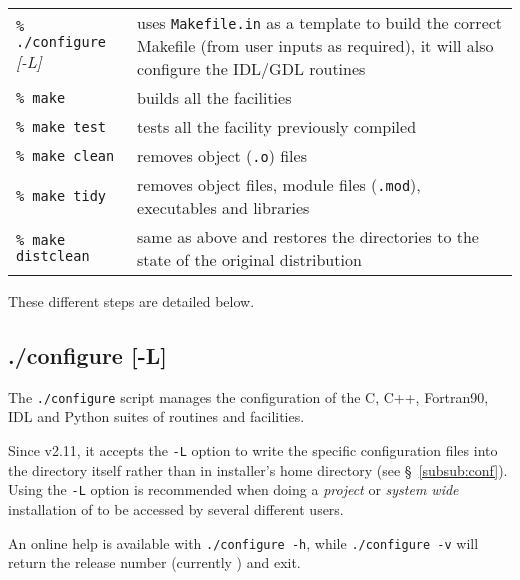 \documentclass[12pt,twoside]{article}
\begin{document}
\begin{flushright}
\begin{tabular}{p{0.3\hsize} p{0.60\hsize}}
{\tt \% ./configure} {\em [-L]}    & uses {\tt Makefile.in} as a template to build 
                         the correct Makefile (from user inputs as required), it
                         will also configure the IDL/GDL routines\\
{\tt \% make}           & builds all the facilities \\
{\tt \% make test}      & tests all the facility previously compiled \\
{\tt \% make clean}     & removes object ({\tt *.o}) files \\
{\tt \% make tidy}      & removes object files, module files ({\tt *.mod}), executables and libraries \\
{\tt \% make distclean} & same as above and restores the directories to the state of the 
                          original distribution \\
\end{tabular}
\end{flushright}
These different steps are detailed below.

\subsection{./configure [-L]}

The {\tt ./configure} script manages the configuration of the C, C++,
Fortran90, IDL and Python suites of routines and facilities.

Since v2.11, it accepts the {\tt -L} option to write the \healpix specific configuration files
into the \healpix directory itself rather than in installer's home directory (see
\S~\ref{subsub:conf}).
Using the {\tt -L} option is recommended when doing a {\em project} or {\em system wide} installation of
\healpix to be accessed by several different users.

An online help is available with 
{\tt ./configure~-h}, while 
{\tt ./configure~-v} 
will return the \healpix release number (currently \hpxversion) and exit.
\end{document}

